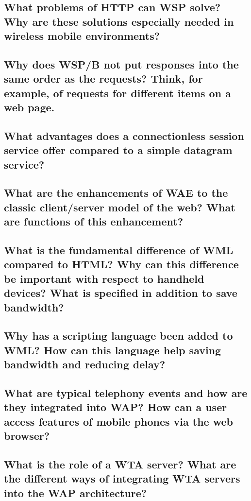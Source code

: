 \subsection{What problems of HTTP can WSP solve? Why are these solutions especially needed
in wireless mobile environments?}

\subsection{Why does WSP/B not put responses into the same order as the requests? Think, for
example, of requests for different items on a web page.}

\subsection{What advantages does a connectionless session service offer compared to a simple
datagram service?}

\subsection{What are the enhancements of WAE to the classic client/server model of the web?
What are functions of this enhancement?}

\subsection{What is the fundamental difference of WML compared to HTML? Why can this
difference be important with respect to handheld devices? What is specified in
addition to save bandwidth?}

\subsection{Why has a scripting language been added to WML? How can this language help
saving bandwidth and reducing delay?}

\subsection{What are typical telephony events and how are they integrated into WAP? How can a
user access features of mobile phones via the web browser?}

\subsection{What is the role of a WTA server? What are the different ways of integrating WTA
servers into the WAP architecture?}

